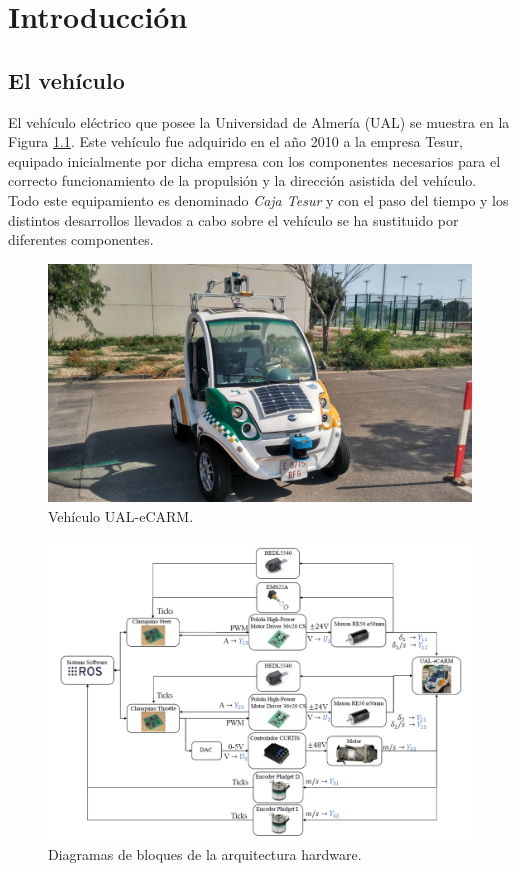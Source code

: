 \chapter{Introducción}
\section{El vehículo}
El vehículo eléctrico que posee la Universidad de Almería (UAL) se muestra en la Figura \ref{fig:vehiculo}. Este vehículo fue adquirido en el año 2010 a la empresa Tesur, equipado inicialmente por dicha empresa con los componentes necesarios para el correcto funcionamiento de la propulsión y la dirección asistida del vehículo. Todo este equipamiento es denominado \textit{Caja Tesur} y con el paso del tiempo y los distintos desarrollos llevados a cabo sobre el vehículo se ha sustituido por diferentes componentes. 

\begin{figure}[!ht]
  \centering
    \includegraphics[width=1\textwidth]{Figuras/vehiculo-aparcamientos.jpg}
  \caption{Vehículo UAL-eCARM.}
  \label{fig:vehiculo}
\end{figure}

\begin{figure}[!ht]
  \centering
    \includegraphics[width=1\textwidth]{Figuras/Diagrama_completo.PNG}
  \caption{Diagramas de bloques de la arquitectura hardware.}
  \label{fig:diagramas_bloques_hardware}
\end{figure}

